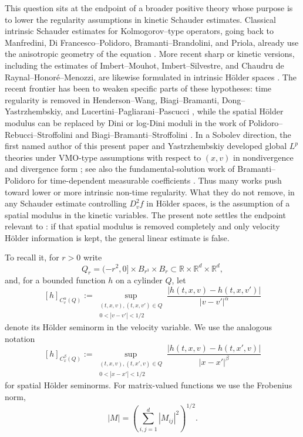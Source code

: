 \documentclass[10pt,a4paper]{amsart}
\numberwithin{equation}{section}
\newcommand{\R}{\mathbb{R}}
\begin{document}
This question sits at the endpoint of a broader positive theory whose
purpose is to lower the regularity assumptions in kinetic Schauder
estimates.  Classical intrinsic Schauder estimates for Kolmogorov--type
operators, going back to Manfredini, Di Francesco--Polidoro,
Bramanti--Brandolini, and Priola, already use the anisotropic geometry
of the equation \cite{Manfredini,DiFrancescoPolidoro,BramantiBrandolini,Priola}.
More recent sharp or kinetic versions, including the estimates of
Imbert--Mouhot, Imbert--Silvestre, and Chaudru de Raynal--Honor\'e--Menozzi,
are likewise formulated in intrinsic H\"older spaces
\cite{ImbertMouhot,ImbertSilvestreSchauder,ChaudruHonoreMenozzi}.  The
recent frontier has been to weaken specific parts of these hypotheses:
time regularity is removed in Henderson--Wang, Biagi--Bramanti,
Dong--Yastrzhembskiy, and Lucertini--Pagliarani--Pascucci
\cite{HW,BiagiBramanti,DongYastrzhembskiySchauder,LucertiniPagliaraniPascucciRegularity,LucertiniPagliaraniPascucciSchauder},
while the spatial H\"older modulus can be replaced by Dini or
log-Dini moduli in the work of Polidoro--Rebucci--Stroffolini and
Biagi--Bramanti--Stroffolini
\cite{PolidoroRebucciStroffolini,BiagiBramantiStroffolini}.  In a
Sobolev direction, the first named author of this present paper and Yastrzhembskiy developed global \(L^p\)
theories under VMO-type assumptions {with respect to $(x,v)$} in nondivergence and divergence
form \cite{DongYastrzhembskiyLpND,DongYastrzhembskiyLpD}; see also the
fundamental-solution work of Bramanti--Polidoro for time-dependent
measurable coefficients \cite{BramantiPolidoro}.  Thus many works push
toward lower or more intrinsic non-time regularity.  What they do not
remove, in any Schauder estimate controlling \(D_v^2 f\) in H\"older
spaces, is the {assumption} of a spatial modulus in the kinetic variables.
The present note settles the endpoint relevant to \cite[Conjecture~1.3]{HW}:
if that spatial modulus is removed completely and only velocity
H\"older information is kept, the general linear estimate is false.

To recall it, for $r>0$ write
\[
   Q_r=(-r^2,0]\times B_{r^3}\times B_r\subset\R\times\R^d\times\R^d,
\]
and, for a bounded function $h$ on a cylinder $Q$, let
\[
   [h]_{C_v^\alpha(Q)}
   :=\sup_{\substack{(t,x,v),(t,x,v')\in Q\\0<|v-v'|<1/2}}
       \frac{|h(t,x,v)-h(t,x,v')|}{|v-v'|^\alpha}
\]
denote its H\"older seminorm in the velocity variable.  We use the analogous notation
\[
   [h]_{C_x^\beta(Q)}
   :=\sup_{\substack{(t,x,v),(t,x',v)\in Q\\0<|x-x'|<1/2}}
       \frac{|h(t,x,v)-h(t,x',v)|}{|x-x'|^\beta}
\]
for spatial H\"older seminorms.  For matrix-valued functions we use the
Frobenius norm,
\[
   |M|=\left(\sum_{i,j=1}^d |M_{ij}|^2\right)^{1/2}.
\]
\end{document}

